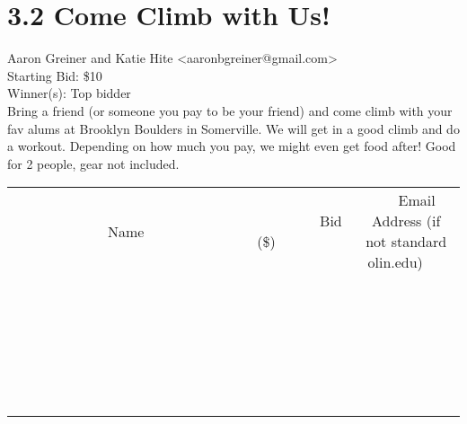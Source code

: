 \documentclass[11pt]{article}
\begin{document}
					\section*{3.2 Come Climb with Us!}
					Aaron Greiner and Katie Hite <aaronbgreiner@gmail.com> \\
					Starting Bid: \$10 \\
					Winner(s): Top bidder \\
					Bring a friend (or someone you pay to be your friend) and come climb with your fav alums at Brooklyn Boulders in Somerville. We will get in a good climb and do a workout. Depending on how much you pay, we might even get food after! Good for 2 people, gear not included. \\
					[6ex]
					\begin{tabular}{c c c}
						~~~~~~~~~~~~~Name~~~~~~~~~~~~~ & ~~~~~~~~~Bid (\$)~~~~~~~~~ & ~~~Email Address (if not standard olin.edu)~~~ \\
				
 & & \\
\hline
 & & \\
\hline
 & & \\
\hline
 & & \\
\hline
 & & \\
\hline
 & & \\
\hline
 & & \\
\hline
 & & \\
\hline
 & & \\
\hline
 & & \\
\hline
 & & \\
\hline
 & & \\
\hline
 & & \\
\hline
 & & \\
\hline
 & & \\
\hline
 & & \\
\hline
 & & \\
\hline
 & & \\
\hline
 & & \\
\hline
 & & \\
\hline
 & & \\
\hline
 & & \\
\hline
 & & \\
\hline
 & & \\
\hline
 & & \\
\hline
 & & \\
\hline
					\end{tabular}
					\clearpage
				
\end{document}
